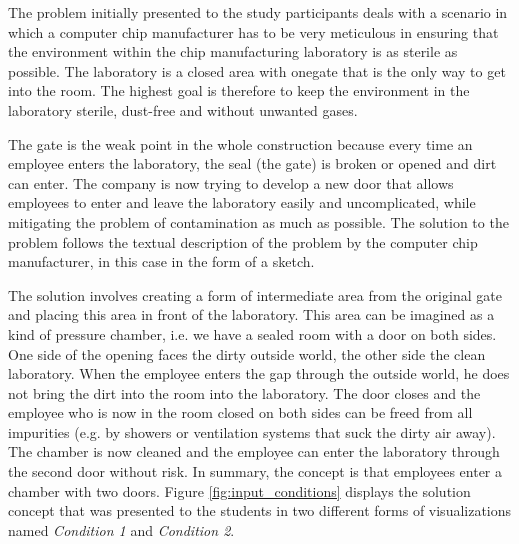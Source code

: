 \documentclass[12pt]{article}
\begin{document}
The problem initially presented to the study participants deals with a scenario in which a computer chip manufacturer has to be very meticulous in ensuring that the environment within the chip manufacturing laboratory is as sterile as possible. The laboratory is a closed area with onegate that is the only way to get into the room. The highest goal is therefore to keep the environment in the laboratory sterile, dust-free and without unwanted gases. 

The gate is the weak point in the whole construction because every time an employee enters the laboratory, the seal (the gate) is broken or opened and dirt can enter. The company is now trying to develop a new door that allows employees to enter and leave the laboratory easily and uncomplicated, while mitigating the problem of contamination as much as possible. The solution to the problem follows the textual description of the problem by the computer chip manufacturer, in this case in the form of a sketch. 

The solution involves creating a form of intermediate area from the original gate and placing this area in front of the laboratory. This area can be imagined as a kind of pressure chamber, i.e. we have a sealed room with a door on both sides. One side of the opening faces the dirty outside world, the other side the clean laboratory. When the employee enters the gap through the outside world, he does not bring the dirt into the room into the laboratory. The door closes and the employee who is now in the room closed on both sides can be freed from all impurities (e.g. by showers or ventilation systems that suck the dirty air away). The chamber is now cleaned and the employee can enter the laboratory through the second door without risk. In summary, the concept is that employees enter a chamber with two doors. Figure \ref{fig:input_conditions} displays the solution concept that was presented to the students in two different forms of visualizations named \textit{Condition 1} and \textit{Condition 2}.
\end{document}
